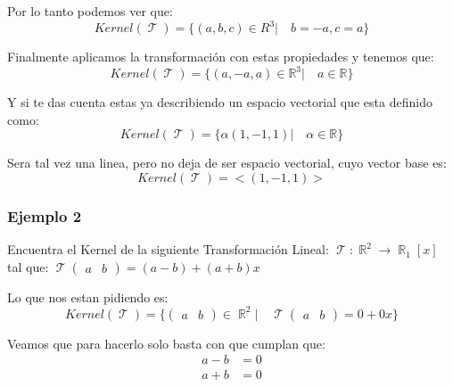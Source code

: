 \documentclass[12pt]{report}                                    %
\DeclareMathOperator \Real {\mathbb{R}}                         %
\DeclareMathOperator \LinealTransformation {\mathcal{T}}        %
\DeclareMathOperator \LT {\mathcal{T}}                          %
\newcommand{\pVector}[1]{                                       %
        \ensuremath{\begin{pmatrix}#1\end{pmatrix}}                 %
    }
\begin{document}
            Por lo tanto podemos ver que:
            \begin{equation*}
                Kernel(\LinealTransformation) = \{(a,b,c)\in R^3 |\quad b = -a, c = a \}
            \end{equation*}

            Finalmente aplicamos la transformación con estas propiedades y tenemos que:
            \begin{equation*}
                Kernel(\LinealTransformation) = \{(a,-a,a)\in \mathbb{R}^3 |\quad a \in \mathbb{R}\}
            \end{equation*}

            Y si te das cuenta estas ya describiendo un espacio vectorial que esta definido como:
            \begin{equation*}
                Kernel(\LinealTransformation) = \{\alpha(1,-1,1) |\quad \alpha\in \mathbb{R}\}
            \end{equation*}

            Sera tal vez una linea, pero no deja de ser espacio vectorial, cuyo vector base es:
            \begin{equation*}
                Kernel(\LinealTransformation) = <(1,-1,1)>
            \end{equation*}


            \clearpage
            \subsubsection{Ejemplo 2}
            Encuentra el Kernel de la siguiente Transformación Lineal:
            $\LinealTransformation : \Real^2 \to \Real_1[x]$ tal que: 
            $\LinealTransformation \pVector{a&b} = (a-b) + (a+b)x$

            Lo que nos estan pidiendo es:
            \begin{equation*}
                Kernel(\LT) = \{ \pVector{a&b} \in \Real^2 |\quad \LT\pVector{a&b} = 0+0x \}
            \end{equation*}

            Veamos que para hacerlo solo basta con que cumplan que:
            \begin{equation*}
            \begin{split}
                a - b       & = 0 \\
                a + b       & = 0 \\
            \end{split}
            \end{equation*}
\end{document}
